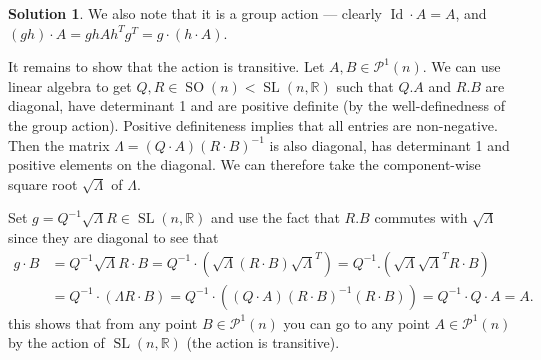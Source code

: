 \documentclass{article}[10pt]
\theoremstyle{definition}
\newtheorem*{solution*}{Solution}
\newcommand{\bbR}{\mathbb{R}}
\begin{document}
\begin{enumerate}
{\begin{mdframed}
\begin{solution*}
\noindent
We also note that it is a group action --- clearly $\operatorname{Id}\cdot A = A$, and $(gh)\cdot A = ghAh^Tg^T = g\cdot(h\cdot A)$.

\noindent
It remains to show that the action is transitive. Let $A,B\in \mathcal{P}^1(n)$. We can use linear algebra to get $Q,R \in \operatorname{SO}(n)<\operatorname{SL}(n,\bbR)$ such that $Q.A$ and $R.B$ are diagonal, have determinant 1 and are positive definite (by the well-definedness of the group action). Positive definiteness implies that all entries are non-negative. Then the matrix $\Lambda=(Q\cdot A) (R\cdot B)^{-1}$ is also diagonal, has determinant 1 and positive elements on the diagonal. We can therefore take the component-wise square root $\sqrt{\Lambda}$ of $\Lambda$. 

Set $g=Q^{-1}\sqrt{\Lambda}R\in\operatorname{SL}(n,\bbR)$ and use the fact that $R.B$ commutes with $\sqrt{\Lambda}$ since they are diagonal to see that
\begin{align*}
g\cdot B&=Q^{-1}\sqrt{\Lambda}R\cdot B=Q^{-1}\cdot \left(\sqrt{\Lambda}(R\cdot B){\sqrt{\Lambda}}^T\right) =Q^{-1}.\left(\sqrt{\Lambda}{\sqrt{\Lambda}}^T  R\cdot B\right) \\ &= Q^{-1}\cdot(\Lambda R\cdot B)
= Q^{-1}\cdot ((Q\cdot A)(R\cdot B)^{-1}(R\cdot B))=Q^{-1}\cdot Q \cdot A=A.
\end{align*}
this shows that from any point $B\in \mathcal{P}^1(n)$ you can go to any point $A \in \mathcal{P}^1(n)$ by the action of $\operatorname{SL}(n,\bbR)$ (the action is transitive). 
\end{solution*}
\end{mdframed}}
\end{enumerate}
\end{document}
